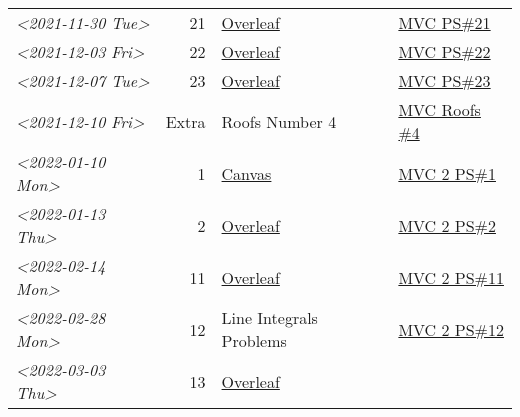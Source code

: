 \documentclass[letterpaper]{article}
\begin{document}
\begin{center}
\begin{tabular}{lrll}
\textit{<2021-11-30 Tue>} & 21 & \href{https://www.overleaf.com/read/ycjqxsjqhrqs}{Overleaf} & \href{../../../src/mathematics/multi_variable_calculus/KBhmvc_ps_21.org}{MVC PS\#21}\\
\textit{<2021-12-03 Fri>} & 22 & \href{https://www.overleaf.com/project/61aa47650d65cd6936cfd852}{Overleaf} & \href{../../../src/mathematics/multi_variable_calculus/KBhmvc_ps_22.org}{MVC PS\#22}\\
\textit{<2021-12-07 Tue>} & 23 & \href{https://www.overleaf.com/project/61ae7329269279ccbccb269f}{Overleaf} & \href{../../../src/mathematics/multi_variable_calculus/KBhmvc_ps_23.org}{MVC PS\#23}\\
\textit{<2021-12-10 Fri>} & Extra & Roofs Number 4 & \href{../../../src/mathematics/multi_variable_calculus/KBhmvc_roofs_4.org}{MVC Roofs \#4}\\
\textit{<2022-01-10 Mon>} & 1 & \href{https://nuevaschool.instructure.com/courses/4135/assignments/65916}{Canvas} & \href{../../../src/mathematics/multi_variable_calculus/KBhmvc_2_ps_1.org}{MVC 2 PS\#1}\\
\textit{<2022-01-13 Thu>} & 2 & \href{https://www.overleaf.com/project/61108fb607d007017107a355}{Overleaf} & \href{../../../src/mathematics/multi_variable_calculus/KBhmvc_2_ps_2.org}{MVC 2 PS\#2}\\
\textit{<2022-02-14 Mon>} & 11 & \href{https://www.overleaf.com/project/62097f19f7ed6fe9dc5a9135}{Overleaf} & \href{../../../src/mathematics/multi_variable_calculus/KBhmvc_2_ps_11.org}{MVC 2 PS\#11}\\
\textit{<2022-02-28 Mon>} & 12 & Line Integrals Problems & \href{../../../src/mathematics/multi_variable_calculus/KBhmvc_2_ps_12.org}{MVC 2 PS\#12}\\
\textit{<2022-03-03 Thu>} & 13 & \href{https://nuevaschool.instructure.com/courses/4135/assignments/68062}{Overleaf} & \\
\end{tabular}
\end{center}
\end{document}
